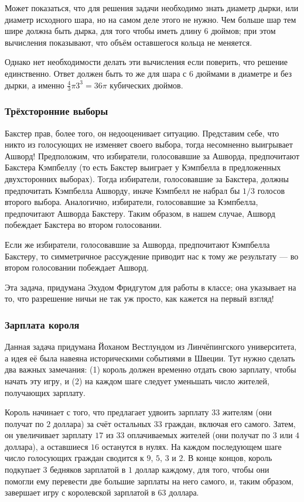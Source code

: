 Может показаться, что для решения задачи необходимо знать диаметр дырки, или диаметр исходного шара, но на самом деле этого не нужно.
Чем больше шар тем шире должна быть дырка, для того чтобы иметь длину 6 дюймов;
при этом вычисления показывают, что объём оставшегося кольца не меняется.

Однако нет необходимости делать эти вычисления если поверить, что решение единственно.
Ответ должен быть то же для шара с 6 дюймами в диаметре и без дырки, а именно $\tfrac43\pi3^3=36\pi$ кубических дюймов.

\subsubsection*{Трёхсторонние выборы}%

Бакстер прав, более того, он недооценивает ситуацию.
Представим себе, что никто из голосующих не изменяет своего выбора, тогда несомненно выигрывает Ашворд!
Предположим, что избиратели, голосовавшие за Ашворда, предпочитают Бакстера Кэмпбеллу (то есть Бакстер выиграет у Кэмпбелла в предложенных двухсторонних выборах).
Тогда избиратели, голосовавшие за Бакстера, должны предпочитать
Кэмпбелла Ашворду, иначе Кэмпбелл не набрал бы $1/3$ голосов второго выбора.
Аналогично, избиратели, голосовавшие за Кэмпбелла, предпочитают Ашворда
Бакстеру.
Таким образом, в нашем случае, Ашворд побеждает Бакстера во втором
голосовании.

Если же избиратели, голосовавшие за Ашворда, предпочитают Кэмпбелла Бакстеру, то симметричное рассуждение приводит нас к тому же результату --- во втором голосовании побеждает Ашворд.
\heart

Эта задача, придумана Эхудом Фридгутом %
для работы в классе;
она указывает на то, что разрешение ничьи не так уж просто, как кажется на первый взгляд!

\subsubsection*{Зарплата короля}%

Данная задача придумана Йоханом Вестлундом %
из Линчёпингского университета, а идея её была навеяна историческими событиями в Швеции.
Тут нужно сделать два важных замечания: (1) король должен временно отдать свою зарплату, чтобы начать эту игру, и (2) на каждом шаге следует уменьшать число жителей, получающих зарплату.

Король начинает с того, что предлагает удвоить зарплату $33$ жителям (они получат по $2$ доллара) за счёт остальных $33$ граждан, включая его самого.
Затем, он увеличивает зарплату $17$ из $33$ оплачиваемых жителей (они получат по $3$ или $4$ доллара), а оставшиеся $16$ останутся в нулях.
На каждом последующем шаге число голосующих граждан сводится к $9$, $5$, $3$ и $2$.
В конце концов, король подкупает $3$ бедняков зарплатой в $1$ доллар каждому, для того, чтобы они помогли ему перевести две большие зарплаты на него самого, и, таким образом, завершает игру с королевской зарплатой в $63$ доллара.

